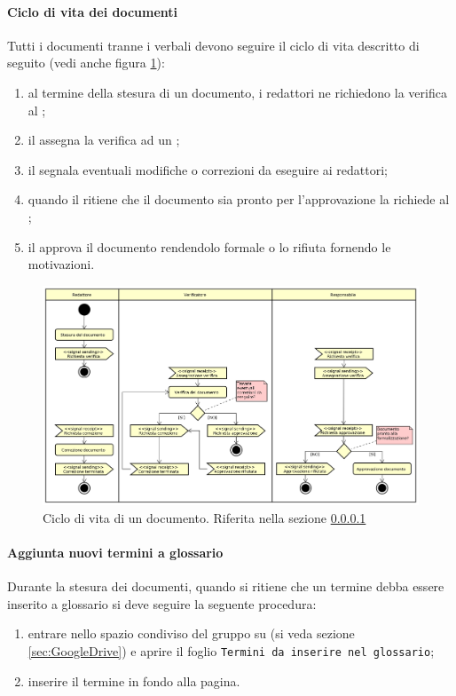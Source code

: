             \paragraph{Ciclo di vita dei documenti}\label{sec:ciclodivitadoc}
            Tutti i documenti tranne i verbali devono seguire il ciclo di vita descritto di seguito (vedi anche figura \ref{fig:ciclovitadoc}):
            \begin{enumerate}
                \item al termine della stesura di un documento, i redattori ne richiedono la verifica al \responsabile;
                \item il \responsabile{} assegna la verifica ad un \verificatore;
                \item il \verificatore{} segnala eventuali modifiche o correzioni da eseguire ai redattori;
                \item quando il \verificatore{} ritiene che il documento sia pronto per l'approvazione la richiede al \responsabile;
                \item il \responsabile{} approva il documento rendendolo formale o lo rifiuta fornendo le motivazioni.
            \end{enumerate}
            \begin{figure}[H]
		        \includegraphics[width=\textwidth]{img/ciclo_di_vita_doc}
		        \caption{Ciclo di vita di un documento. Riferita nella sezione \ref{sec:ciclodivitadoc}}
                \label{fig:ciclovitadoc}
	        \end{figure}
	        
	        \paragraph{Aggiunta nuovi termini a glossario} \label{sec:insTermine}
	        Durante la stesura dei documenti, quando si ritiene che un termine debba essere inserito a glossario si deve seguire la seguente procedura:
	        \begin{enumerate}
	        	\item entrare nello spazio condiviso del gruppo su  (si veda sezione \ref{sec:GoogleDrive}) e aprire il foglio \texttt{Termini da inserire nel glossario};
	        	\item inserire il termine in fondo alla pagina.
	        \end{enumerate}
  
